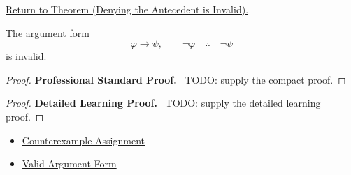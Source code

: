 \newpage
{}
\label{prf:denying-antecedent-invalid-propositional-logic}

\begin{remark*}[Return]
\hyperref[thm:denying-antecedent-invalid-propositional-logic]{Return to Theorem (Denying the Antecedent is Invalid).}
\end{remark*}

\begin{theorem*}
The argument form
\[
\varphi\to\psi,\qquad \neg\varphi \quad\therefore\quad \neg\psi
\]
is invalid.
\end{theorem*}

\begin{proof}
\textbf{Professional Standard Proof.}~
TODO: supply the compact proof.
\end{proof}

\begin{proof}
\textbf{Detailed Learning Proof.}~
TODO: supply the detailed learning proof.
\end{proof}

\begin{remark*}
\end{remark*}

\begin{dependencies}
\begin{itemize}
  \item \hyperref[def:counterexample-assignment-propositional-logic]{Counterexample Assignment}
  \item \hyperref[def:valid-argument-form-propositional-logic]{Valid Argument Form}
\end{itemize}
\end{dependencies}

\clearpage
